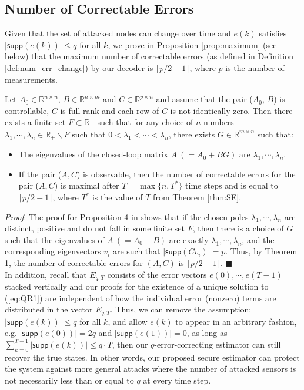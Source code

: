 \documentclass[../../thesis.tex]{subfiles}
\begin{document}
\subsection{Number of Correctable Errors}\label{sec:max_q}

Given that the set of attacked nodes can change over time and $e(k)$ satisfies $\lvert \textsf{supp} (e(k)) \rvert \le q$ for all $k$, we prove in Proposition \ref{prop:maximum} (see below) that the maximum number of correctable errors (as defined in Definition \ref{def:num_err_change}) by our decoder is $\lceil p/2-1 \rceil$, where $p$ is the number of measurements. 

\begin{proposition}\label{prop:maximum} 
Let $A_0 \in \mathbb{R}^{n \times n}$, $B \in \mathbb{R}^{n \times m}$ and $C \in \mathbb{R}^{p \times n}$ and assume that the pair ($A_0$, $B$) is controllable, $C$ is full rank and each row of $C$ is not identically zero. Then there exists a finite set $F \subset \mathbb{R}_+$ such that for any choice of $n$ numbers $\lambda_1, \cdots, \lambda_n \in \mathbb{R}_+ \backslash F$ such that $0<\lambda_1< \cdots < \lambda_n$, there exists $G \in \mathbb{R}^{m \times n}$ such that:
\begin{itemize}
\item
The eigenvalues of the closed-loop matrix $A~(= A_0+BG)$ are $\lambda_1, \cdots, \lambda_n$.
\item
If the pair ($A, C$) is observable, then the number of correctable errors for the pair ($A, C$) is maximal after $T= \max\{n, T^*\}$ time steps and is equal to $\lceil p/2-1 \rceil$, where $T^*$ is the value of $T$ from Theorem \ref{thm:SE}. 
\end{itemize}
\end{proposition}

\textit{Proof}:
The proof for Proposition 4 in \cite{Fawzi:2014} shows that if the chosen poles $\lambda_1, \cdots, \lambda_n$ are distinct, positive and do not fall in some finite set $F$, then there is a choice of $G$ such that the eigenvalues of $A~(=A_0+B)$ are exactly $\lambda_1, \cdots, \lambda_n$, and the corresponding eigenvectors $v_i$ are such that $\lvert \textsf{supp} (C v_i) \rvert = p$. Thus, by Theorem 1, the number of correctable errors for $(A,C)$ is $\lceil p/2-1 \rceil$.
\hfill$\blacksquare$\\

In addition, recall that $E_{q,T}$ consists of the error vectors $e(0), \cdots, e(T-1)$ stacked vertically and our proofs for the existence of a unique solution to (\ref{eq:QR1}) are independent of how the individual error (nonzero) terms are distributed in the vector $E_{q,T}$. Thus, we can remove the assumption: $\lvert \textsf{supp} (e(k)) \rvert \le q$ for all $k$, and allow $e(k)$ to appear in an arbitrary fashion, e.g. $\lvert \textsf{supp} (e(0)) \rvert = 2q$ and $\lvert \textsf{supp} (e(1)) \rvert = 0$, as long as $\sum_{k=0}^{T-1} \lvert \textsf{supp} (e(k)) \rvert \leq q\cdot T$, then our $q$-error-correcting estimator can still recover the true states. In other words, our proposed secure estimator can protect the system against more general attacks where the number of attacked sensors is not necessarily less than or equal to $q$ at every time step.
\end{document}
